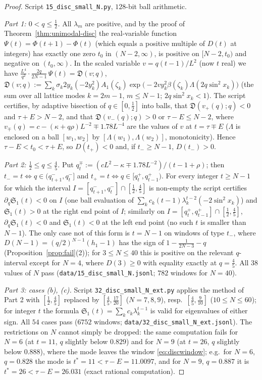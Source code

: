 \documentclass[11pt,a4paper]{article}
\theoremstyle{definition}
\theoremstyle{remark}
\begin{document}
\begin{proof}
Script \texttt{15\_disc\_small\_N.py}, $128$-bit ball arithmetic.

\emph{Part 1: $0<q\le\frac12$.} All $\lambda_m$ are positive, and by the proof of Theorem~\ref{thm:unimodal-disc}
the real-variable function $\Psi(t)=\Phi(t+1)-\Phi(t)$ (which equals a positive multiple of $D(t)$ at integers)
has exactly one zero $t_0$ in $(N-2,\infty)$, is positive on $[N-2,t_0)$ and negative on $(t_0,\infty)$. In
the scaled variable $v=q(t-1)/L^2$ (now $t$ real) we have $\frac{L^4}{q^2}\cdot\frac{2q}{2N-1}\,\Psi(t)=\mathfrak D(v;q)$,
$\mathfrak D(v;q):=\sum_k\sigma_k2y_k(-2y_k^2)A_1(\zeta_k)\exp\bigl(-2vy_k^2\beta(\zeta_k)\Lambda(2q\sin^2x_k)\bigr)$
(the sum over all lattice modes $k=2m-1$, $m\le N-1$; $2q\sin^2x_k<1$).
The script certifies, by adaptive bisection of $q\in[0,\frac12]$ into balls, that
$\mathfrak D(v_+(q);q)<0$ and $\tau+E>N-2$, and that $\mathfrak D(v_-(q);q)>0$ or $\tau-E\le N-2$, where
$v_\mp(q)=c-(\kappa+q\rho)L^{-2}\mp1.78L^{-4}$ are the values of $v$ at $t=\tau\mp E$ ($\Lambda$ is enclosed on a
ball $[w_1,w_2]$ by $[\Lambda(w_1),\Lambda(w_2)]$, monotonicity). Hence $\tau-E<t_0<\tau+E$, so $D(t_+)<0$ and, if
$t_-\ge N-1$, $D(t_-)>0$.

\emph{Part 2: $\frac12\le q\le\frac45$.} Put $q^\mp_t:=(cL^2-\kappa\mp1.78L^{-2})/(t-1+\rho)$; then
$t_-=t\iff q\in(q^-_{t+1},q^-_t]$ and $t_+=t\iff q\in[q^+_t,q^+_{t-1})$. For every integer $t\ge N-1$ for which
the interval $I=[q^-_{t+1},q^-_t]\cap[\frac12,\frac45]$ is non-empty the script certifies
$\partial_q\mathfrak S_1(t)<0$ on $I$ (one ball evaluation of
$\sum_kc_k(t-1)\lambda_k^{t-2}(-2\sin^2x_k)$) and $\mathfrak S_1(t)>0$ at the right end point of $I$; similarly
on $I=[q^+_t,q^+_{t-1}]\cap[\frac12,\frac45]$, $\partial_q\mathfrak S_1(t)<0$ and $\mathfrak S_1(t)<0$ at the left
end point (no such $t$ is smaller than $N-1$). The only case not of this form is $t=N-1$ on windows of type $t_-$,
where $D(N-1)=(q/2)^{N-1}(h_1-1)$ has the sign of $1-\frac1{2N-3}-q$ (Proposition~\ref{prop:fail}(2)); for
$3\le N\le40$ this is positive on the relevant $q$-interval except for $N=4$, where $D(3)\ge0$ with equality
exactly at $q=\frac45$. All $38$ values of $N$ pass (\texttt{data/15\_disc\_small\_N.jsonl}; $782$ windows for
$N=40$).

\emph{Part 3: cases (b), (c).} Script \texttt{32\_disc\_small\_N\_ext.py} applies the method of Part 2 with
$[\frac12,\frac45]$ replaced by $[\frac45,\frac{17}{20}]$ ($N=7,8,9$), resp.\ $[\frac45,\frac9{10}]$ ($10\le N\le60$); for
integer $t$ the formula $\mathfrak S_1(t)=\sum_kc_k\lambda_k^{t-1}$ is valid for eigenvalues of either sign. All $54$
cases pass ($6752$ windows; \texttt{data/32\_disc\_small\_N\_ext.jsonl}). The restrictions on $N$ cannot simply be dropped:
the same computation fails for $N=6$ (at $t=11$, $q$ slightly below $0.829$) and for $N=9$ (at $t=26$, $q$ slightly below
$0.888$), where the mode leaves the window \eqref{eq:discwindow}; e.g.\ for $N=6$, $q=0.828$ the mode is $t^*=11<\tau-E=11.0097$,
and for $N=9$, $q=0.887$ it is $t^*=26<\tau-E=26.031$ (exact rational computation).
\end{proof}
\end{document}
